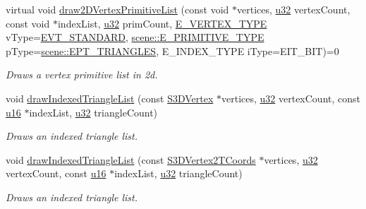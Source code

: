 \begin{DoxyCompactItemize}
virtual void \hyperlink{classirr_1_1video_1_1IVideoDriver_a34845920167c68578a78f842af54d140}{draw2\+D\+Vertex\+Primitive\+List} (const void $\ast$vertices, \hyperlink{namespaceirr_a0416a53257075833e7002efd0a18e804}{u32} vertex\+Count, const void $\ast$index\+List, \hyperlink{namespaceirr_a0416a53257075833e7002efd0a18e804}{u32} prim\+Count, \hyperlink{namespaceirr_1_1video_a0e3b59e025e0d0db0ed2ee0ce904deac}{E\+\_\+\+V\+E\+R\+T\+E\+X\+\_\+\+T\+Y\+PE} v\+Type=\hyperlink{namespaceirr_1_1video_a0e3b59e025e0d0db0ed2ee0ce904deaca921f287a4f48d612a5be2d89453ca262}{E\+V\+T\+\_\+\+S\+T\+A\+N\+D\+A\+RD}, \hyperlink{namespaceirr_1_1scene_a5d7de82f2169761194b2f44d95cdc1dc}{scene\+::\+E\+\_\+\+P\+R\+I\+M\+I\+T\+I\+V\+E\+\_\+\+T\+Y\+PE} p\+Type=\hyperlink{namespaceirr_1_1scene_a5d7de82f2169761194b2f44d95cdc1dca6c884c4de3210b3ed36c99fb828ce376}{scene\+::\+E\+P\+T\+\_\+\+T\+R\+I\+A\+N\+G\+L\+ES}, E\+\_\+\+I\+N\+D\+E\+X\+\_\+\+T\+Y\+PE i\+Type=E\+I\+T\+\_\+B\+IT)=0
\begin{DoxyCompactList}\small\item\em Draws a vertex primitive list in 2d. \end{DoxyCompactList}\item 
void \hyperlink{classirr_1_1video_1_1IVideoDriver_a55eba6140492faaed9dca7e16ad8dde2}{draw\+Indexed\+Triangle\+List} (const \hyperlink{structirr_1_1video_1_1S3DVertex}{S3\+D\+Vertex} $\ast$vertices, \hyperlink{namespaceirr_a0416a53257075833e7002efd0a18e804}{u32} vertex\+Count, const \hyperlink{namespaceirr_ae9f8ec82692ad3b83c21f555bfa70bcc}{u16} $\ast$index\+List, \hyperlink{namespaceirr_a0416a53257075833e7002efd0a18e804}{u32} triangle\+Count)
\begin{DoxyCompactList}\small\item\em Draws an indexed triangle list. \end{DoxyCompactList}\item 
void \hyperlink{classirr_1_1video_1_1IVideoDriver_a041d8028bc10f33c6707a3d1ddbdea4d}{draw\+Indexed\+Triangle\+List} (const \hyperlink{structirr_1_1video_1_1S3DVertex2TCoords}{S3\+D\+Vertex2\+T\+Coords} $\ast$vertices, \hyperlink{namespaceirr_a0416a53257075833e7002efd0a18e804}{u32} vertex\+Count, const \hyperlink{namespaceirr_ae9f8ec82692ad3b83c21f555bfa70bcc}{u16} $\ast$index\+List, \hyperlink{namespaceirr_a0416a53257075833e7002efd0a18e804}{u32} triangle\+Count)
\begin{DoxyCompactList}\small\item\em Draws an indexed triangle list. \end{DoxyCompactList}\item 

\end{DoxyCompactItemize}
